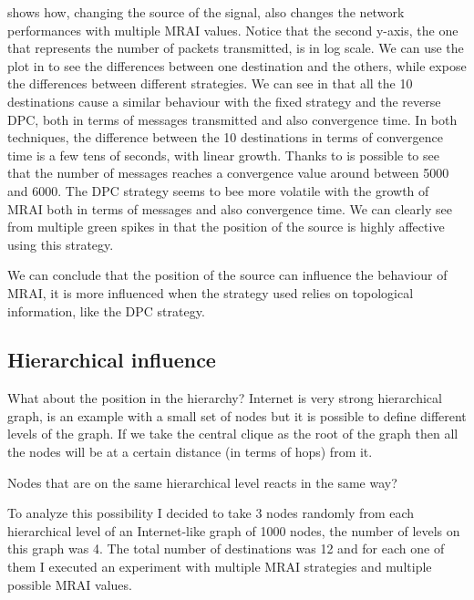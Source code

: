  shows how, changing the source of the signal,
also changes the network performances with multiple \ac{MRAI} values.
Notice that the second y-axis, the one that represents the number of packets
transmitted, is in log scale.
We can use the plot in  to see the 
differences between one destination and the others, while 
expose the differences between different strategies.
We can see in  that all the \num{10} destinations
cause a similar behaviour with the fixed strategy and the reverse \ac{DPC}, both
in terms of messages transmitted and also convergence time.
In both techniques, the difference between the \num{10} destinations in terms of
convergence time is a few tens of seconds, with linear growth.
Thanks to  is possible to see that the
number of messages reaches a convergence value around between \num{5000} and
\num{6000}.
The \ac{DPC} strategy seems to bee more volatile with the growth of \ac{MRAI}
both in terms of messages and also convergence time.
We can clearly see from multiple green spikes in 
that the position of the source is highly affective using this strategy.


We can conclude that the position of the source can influence the behaviour
of \ac{MRAI}, it is more influenced when the strategy used relies on topological
information, like the \ac{DPC} strategy.

\subsection{Hierarchical influence}
\label{subsec:hierarchical_influence}

What about the position in the hierarchy?
Internet is very strong hierarchical graph, 
is an example with a small set of nodes but it is possible to define different levels
of the graph.
If we take the central clique as the root of the graph then all the nodes will
be at a certain distance (in terms of hops) from it.

Nodes that are on the same hierarchical level reacts in the same way? 

To analyze this possibility I decided to take \num{3} nodes randomly from each
hierarchical level of an Internet-like graph of \num{1000} nodes, the number
of levels on this graph was \num{4}.
The total number of destinations was \num{12} and for each one of them I executed
an experiment with multiple \ac{MRAI} strategies and multiple possible \ac{MRAI}
values.

